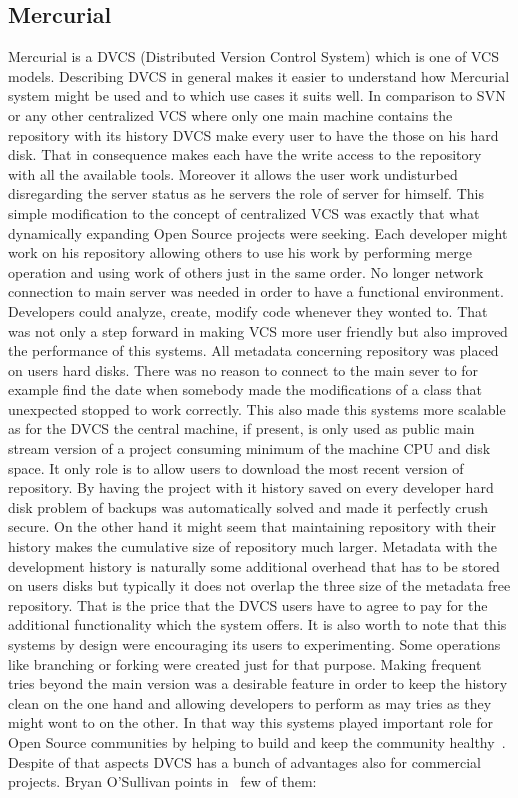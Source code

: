 \subsection{Mercurial}\label{subsec:hg}
Mercurial is a DVCS (Distributed Version Control System) which is one of VCS models. Describing DVCS in general makes it easier to understand how Mercurial system might be used and to which use cases it suits well. In comparison to SVN or any other centralized VCS where only one main machine contains the repository with its history DVCS make every user to have the those on his hard disk. That in consequence makes each have the write access to the repository with all the available tools. Moreover it allows the user work undisturbed disregarding the server status as he servers the role of server for himself. This simple modification to the concept of centralized VCS was exactly that what dynamically expanding Open Source projects were seeking. Each developer might work on his repository allowing others to use his work by performing merge operation and using work of others just in the same order. No longer network connection to main server was needed in order to have a functional environment. Developers could analyze, create, modify code whenever they wonted to. That was not only a step forward in making VCS more user friendly but also improved the performance of this systems. All metadata concerning repository was placed on users hard disks. There was no reason to connect to the main sever to for example find the date when somebody made the modifications of a class that unexpected stopped to work correctly. This also made this systems more scalable as for the DVCS the central machine, if present, is only used as public main stream version of a project consuming minimum of the machine CPU and disk space. It only role is to allow users to download the most recent version of repository. By having the project with it history saved on every developer hard disk problem of backups was automatically solved and made it perfectly crush secure. On the other hand it might seem that maintaining repository with their history makes the cumulative size of repository much larger. Metadata with the development history is naturally some additional overhead that has to be stored on users disks but typically it does not overlap the three size of the metadata free repository. That is the price that the DVCS users have to agree to pay for the additional functionality which the  system offers. It is also worth to note that this systems by design were encouraging its users to experimenting. Some operations like branching or forking were created just for that purpose. Making frequent tries beyond the main version was a desirable feature in order to keep the history clean on the one hand  and allowing developers to perform as may tries as they might wont to on the other. In that way this systems played important role for  Open Source communities by helping to build and keep the community healthy~\cite{git_talk,svn_talk}. Despite of that aspects DVCS has a bunch of advantages also for commercial projects. Bryan O'Sullivan points in~\cite[page 6]{hg_book} few of them: 
